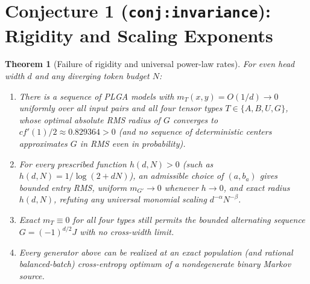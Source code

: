 \documentclass[11pt]{article}
\theoremstyle{plain}
\newtheorem{theorem}{Theorem}
\theoremstyle{definition}
\theoremstyle{remark}
\begin{document}
\section{Conjecture 1 (\texttt{conj:invariance}): Rigidity and Scaling Exponents}

\begin{theorem}[Failure of rigidity and universal power-law rates]\label{thm:rigidity}
For even head width $d$ and any diverging token budget $N$:
\begin{enumerate}[leftmargin=2em,label=\textup{(\arabic*)}]
\item There is a sequence of PLGA models with $m_T(x, y) = O(1/d) \to 0$ uniformly over all input pairs and all four tensor types $T \in \{A, B, U, G\}$, whose optimal absolute RMS radius of $G$ converges to $c f'(1)/2 \approx 0.829364 > 0$ (and no sequence of deterministic centers approximates $G$ in RMS even in probability).
\item For every prescribed function $h(d, N) > 0$ (such as $h(d, N) = 1/\log(2 + dN)$), an admissible choice of $(a, b_a)$ gives bounded entry RMS, uniform $m_{G'} \to 0$ whenever $h \to 0$, and exact radius $h(d, N)$, refuting any universal monomial scaling $d^{-\alpha} N^{-\beta}$.
\item Exact $m_T \equiv 0$ for all four types still permits the bounded alternating sequence $G = (-1)^{d/2} J$ with no cross-width limit.
\item Every generator above can be realized at an exact population (and rational balanced-batch) cross-entropy optimum of a nondegenerate binary Markov source.
\end{enumerate}
\end{theorem}
\end{document}
